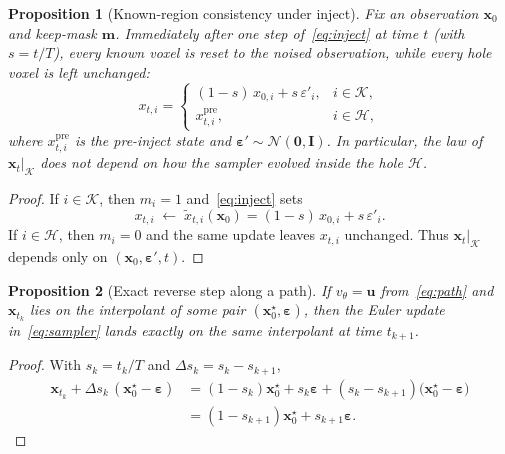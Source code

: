 \documentclass[letterpaper]{article} %
\newtheorem{proposition}{Proposition}
\begin{document}
\begin{proposition}[Known-region consistency under inject]
\label{prop:inject}
Fix an observation \(\mathbf{x}_0\) and keep-mask \(\mathbf{m}\).
Immediately after one step of~\eqref{eq:inject} at time \(t\)
(with \(s=t/T\)), every known voxel is reset to the noised observation,
while every hole voxel is left unchanged:
\begin{equation*}
x_{t,i}
=
\begin{cases}
(1-s)\,x_{0,i}+s\,\varepsilon'_i,
  & i\in\mathcal{K},\\[2pt]
x_{t,i}^{\mathrm{pre}},
  & i\in\mathcal{H},
\end{cases}
\end{equation*}
where \(x_{t,i}^{\mathrm{pre}}\) is the pre-inject state and
\(\boldsymbol{\varepsilon}'\sim\mathcal{N}(\mathbf{0},\mathbf{I})\).
In particular, the law of \(\mathbf{x}_t\big|_{\mathcal{K}}\) does not
depend on how the sampler evolved inside the hole \(\mathcal{H}\).
\end{proposition}
\begin{proof}
If \(i\in\mathcal{K}\), then \(m_i=1\) and~\eqref{eq:inject} sets
\begin{equation*}
x_{t,i}
\;\leftarrow\;
\tilde{x}_{t,i}(\mathbf{x}_0)
=
(1-s)\,x_{0,i}+s\,\varepsilon'_i.
\end{equation*}
If \(i\in\mathcal{H}\), then \(m_i=0\) and the same update leaves
\(x_{t,i}\) unchanged.
Thus \(\mathbf{x}_t\big|_{\mathcal{K}}\) depends only on
\((\mathbf{x}_0,\boldsymbol{\varepsilon}',t)\).
\end{proof}

\begin{proposition}[Exact reverse step along a path]
\label{prop:euler}
If \(v_\theta=\mathbf{u}\) from~\eqref{eq:path} and \(\mathbf{x}_{t_k}\)
lies on the interpolant of some pair
\((\mathbf{x}_0^\star,\boldsymbol{\varepsilon})\), then the Euler update
in~\eqref{eq:sampler} lands exactly on the same interpolant at time
\(t_{k+1}\).
\end{proposition}
\begin{proof}
With \(s_k=t_k/T\) and \(\Delta s_k=s_k-s_{k+1}\),
\begin{align*}
\mathbf{x}_{t_k}+\Delta s_k\,(\mathbf{x}_0^\star-\boldsymbol{\varepsilon})
&=
(1-s_k)\mathbf{x}_0^\star+s_k\boldsymbol{\varepsilon}
+(s_k-s_{k+1})\bigl(\mathbf{x}_0^\star-\boldsymbol{\varepsilon}\bigr)\\
&=
(1-s_{k+1})\mathbf{x}_0^\star+s_{k+1}\boldsymbol{\varepsilon}.
\end{align*}
\end{proof}
\end{document}
